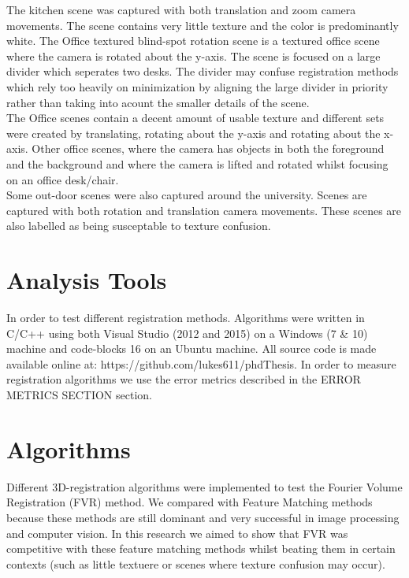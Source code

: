 The kitchen scene was captured with both translation and zoom camera movements. The scene contains very little texture and the color is predominantly white. The Office textured blind-spot rotation scene is a textured office scene where the camera is rotated about the y-axis. The scene is focused on a large divider which seperates two desks. The divider may confuse registration methods which rely too heavily on minimization by aligning the large divider in priority rather than taking into acount the smaller details of the scene. \\

The Office scenes contain a decent amount of usable texture and different sets were created by translating, rotating about the y-axis and rotating about the x-axis. Other office scenes, where the camera has objects in both the foreground and the background and where the camera is lifted and rotated whilst focusing on an office desk/chair. \\

Some out-door scenes were also captured around the university. Scenes are captured with both rotation and translation camera movements. These scenes are also labelled as being susceptable to texture confusion.

\section{Analysis Tools}

In order to test different registration methods. Algorithms were written in C/C++ using both Visual Studio (2012 and 2015) on a Windows (7 \& 10) machine and code-blocks 16 on an Ubuntu machine. All source code is made available online at: https://github.com/lukes611/phdThesis. In order to measure registration algorithms we use the error metrics described in the ERROR METRICS SECTION section.  

\section{Algorithms}

Different 3D-registration algorithms were implemented to test the Fourier Volume Registration (FVR) method. We compared with Feature Matching methods because these methods are still dominant and very successful in image processing and computer vision. In this research we aimed to show that FVR was competitive with these feature matching methods whilst beating them in certain contexts (such as little textuere or scenes where texture confusion may occur). \\ 

